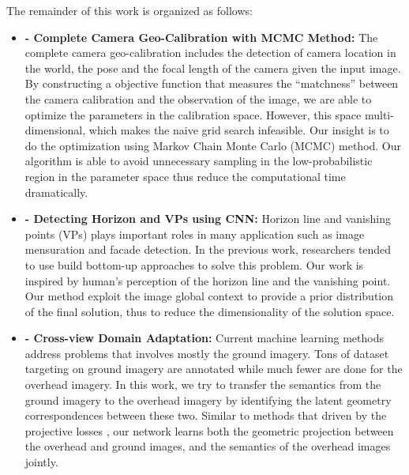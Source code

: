 The remainder of this work is organized as follows:
  
\begin{itemize}[noitemsep]

  \item \textbf{ - 
  Complete Camera Geo-Calibration with MCMC Method:} \newline \newline
  The complete camera geo-calibration includes the detection of camera
  location in the world, the pose and the focal length of the camera
  given the input image. By constructing a objective function that
  measures the ``matchness'' between the camera calibration and the
  observation of the image, we are able to optimize the parameters in
  the calibration space. However, this space multi-dimensional, which
  makes the naive grid search infeasible. Our insight is to do the
  optimization using Markov Chain Monte Carlo (MCMC) method. Our
  algorithm is able to avoid unnecessary sampling in the
  low-probabilistic region in the parameter space thus reduce the
  computational time dramatically. \newline

  \item \textbf{ -
  Detecting Horizon and VPs using CNN:} \newline \newline
  Horizon line and vanishing points (VPs) plays important roles in many
  application such as image mensuration and facade detection. In the
  previous work, researchers tended to use build bottom-up approaches to
  solve this problem. Our work is inspired by human's perception of the
  horizon line and the vanishing point. Our method exploit the image
  global context to provide a prior distribution of the final solution,
  thus to reduce the dimensionality of the solution space. \newline

  \item \textbf{ -
  Cross-view Domain Adaptation:} \newline \newline
  Current machine learning methods address problems that involves mostly
  the ground imagery. Tons of dataset targeting on ground imagery are
  annotated while much fewer are done for the overhead imagery.
  In this work, we try to transfer the semantics from the ground imagery
  to the overhead imagery by identifying the latent geometry
  correspondences between these two. Similar to methods that driven by
  the projective losses , our network learns 
  both the geometric projection between the overhead and ground
  images, and the semantics of the overhead images jointly. \newline


\end{itemize}
